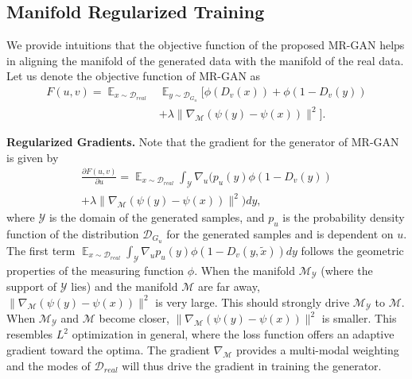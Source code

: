 \documentclass[10pt,twocolumn,letterpaper]{article}
\newcommand{\RR}{\mathbb{R}}
\newcommand{\nn}{\nonumber}
\newcommand{\g}{{G_u}}
\newcommand{\di}{{D_v}}
\newcommand{\D}{\mathcal{D}}
\newcommand{\E}{\mathbb{E}}
\newcommand{\xt}{{\tilde{x}}}
\newcommand{\M}{\mathcal{M}}
\newcommand{\Y}{\mathcal{Y}}
\newtheorem{as}{Assumption}
\begin{document}
\subsection{Manifold Regularized Training}
We provide intuitions that the objective function of the proposed MR-GAN helps in aligning the manifold of the generated data with the manifold of the real data. Let us denote the objective function of MR-GAN as 
\begin{align}
F(u,v)= \mathop{\E}_{x\sim \D_{real}}&\mathop{\E}_{y\sim \D_{\g}}[\phi (\di(x))+ \phi(1-\di(y))\nn\\
&+\lambda \|\nabla_\M (\psi(y)-\psi(x))\|^2].
\end{align}

{\textbf{Regularized Gradients.}} Note that the gradient for the generator of MR-GAN is given by
\begin{align}
\frac{\partial F(u,v)}{\partial u} = \mathop{\E}_{x\sim \D_{real}}\int_{\mathcal{Y}}\nabla_u (p_u(y) \phi(1-\di(y))\nn\\+\lambda \|\nabla_\M (\psi(y)-\psi(x))\|^2)dy,
\end{align}
where $\mathcal{Y}$ is the domain of the generated samples, and $p_u$ is the probability density function of the distribution $\D_{\g}$ for the generated samples and is dependent on $u$.  
The first term $\mathop{\E}_{x\sim \D_{real}}\int_{\mathcal{Y}}\nabla_u p_u(y) \phi(1-\di(y,\xt))dy$ follows the geometric properties of the measuring function $\phi$.
When the manifold $\M_\Y$ (where the support of $\mathcal Y$ lies) and the manifold $\M$ are far away, $\|\nabla_\M (\psi(y)-\psi(x))\|^2$ is very large. This should strongly drive $\M_\Y$ to $\M$. When $\M_\Y$ and $\M$ become closer, $\|\nabla_\M (\psi(y)-\psi(x))\|^2$ is smaller. This resembles $L^2$ optimization in general, where the loss function offers an adaptive gradient toward the optima. The gradient $\nabla_\M$ provides a {{multi-modal weighting}} and the modes of $\D_{real}$ will thus drive the gradient in training the generator.

\end{document}

